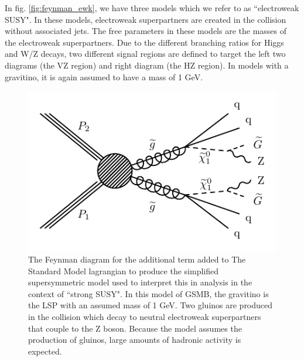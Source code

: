   In fig. \ref{fig:feynman_ewk}, we have three models which we refer to as ``electroweak SUSY". In these models, electroweak superpartners are created in the collision without associated jets. The free parameters in these models are the masses of the electroweak superpartners. Due to the different branching ratios for Higgs and W/Z decays, two different signal regions are defined to target the left two diagrams (the VZ region) and right diagram (the HZ region). In models with a gravitino, it is again assumed to have a mass of 1 GeV.

  \begin{figure}[h!]
    \centering
    \includegraphics[width=.5\textwidth]{figures/diagrams/T5ZZ.pdf}
    \caption{The Feynman diagram for the additional term added to The Standard Model lagrangian to produce the simplified supersymmetric model used to interpret this in analysis in the context of ``strong SUSY". In this model of GSMB, the gravitino is the LSP with an assumed mass of 1 GeV. Two gluinos are produced in the collision which decay to neutral electroweak superpartners that couple to the Z boson. Because the model assumes the production of gluinos, large amounts of hadronic activity is expected.}
    \label{fig:feynman_str}
  \end{figure}


